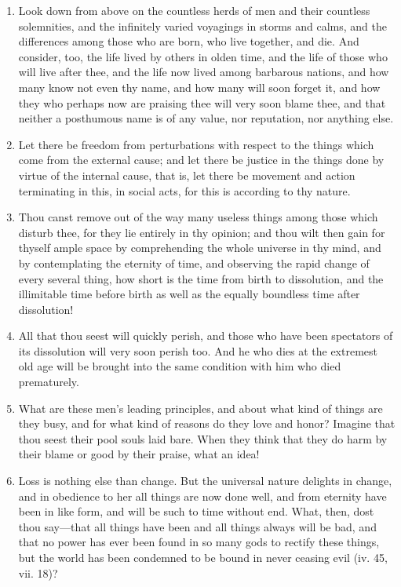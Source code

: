 \begin{enumerate}
\item Look down from above on the countless herds of men and their countless solemnities, and the infinitely varied voyagings in storms and calms, and the differences among those who are born, who live together, and die. And consider, too, the life lived by others in olden time, and the life of those who will live after thee, and the life now lived among barbarous nations, and how many know not even thy name, and how many will soon forget it, and how they who perhaps now are praising thee will very soon blame thee, and that neither a posthumous name is of any value, nor reputation, nor anything else.

\item Let there be freedom from perturbations with respect to the things which come from the external cause; and let there be justice in the things done by virtue of the internal cause, that is, let there be movement and action terminating in this, in social acts, for this is according to thy nature.

\item Thou canst remove out of the way many useless things among those which disturb thee, for they lie entirely in thy opinion; and thou wilt then gain for thyself ample space by comprehending the whole universe in thy mind, and by contemplating the eternity of time, and observing the rapid change of every several thing, how short is the time from birth to dissolution, and the illimitable time before birth as well as the equally boundless time after dissolution!

\item All that thou seest will quickly perish, and those who have been spectators of its dissolution will very soon perish too. And he who dies at the extremest old age will be brought into the same condition with him who died prematurely.

\item What are these men's leading principles, and about what kind of things are they busy, and for what kind of reasons do they love and honor? Imagine that thou seest their pool souls laid bare. When they think that they do harm by their blame or good by their praise, what an idea!

\item Loss is nothing else than change. But the universal nature delights in change, and in obedience to her all things are now done well, and from eternity have been in like form, and will be such to time without end. What, then, dost thou say—that all things have been and all things always will be bad, and that no power has ever been found in so many gods to rectify these things, but the world has been condemned to be bound in never ceasing evil (iv. 45, vii. 18)?


\end{enumerate}
